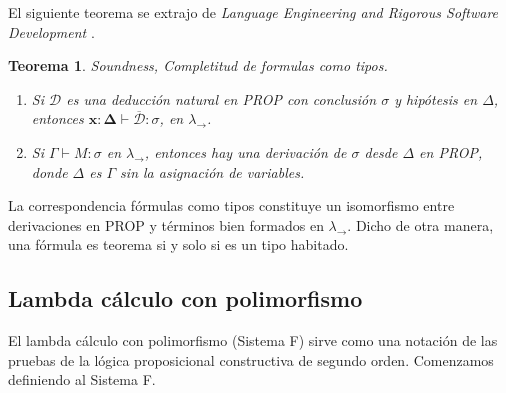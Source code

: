\documentclass[a4paper,11pt]{article}
\newtheorem{theorem}{Teorema}
\theoremstyle{definition}
\theoremstyle{remark}
\begin{document}
El siguiente teorema se extrajo de \textit{Language Engineering and Rigorous Software Development} \cite{languageEng}. 

\begin{theorem}
  Soundness, Completitud de formulas como tipos.

  \begin{enumerate}
  \item Si $\mathcal{D}$ es una deducción natural en PROP con conclusión $\sigma$ y hipótesis en $\Delta$, entonces
    $\bm{x}:\bm{\Delta} \vdash \overline{\mathcal{D}} : \sigma$, en $\lambda_{\rightarrow}$.
  \item Si $\Gamma \vdash M : \sigma$ en $\lambda_{\rightarrow}$, entonces hay una derivación de $\sigma$ desde $\Delta$ en PROP,
    donde $\Delta$ es $\Gamma$ sin la asignación de variables.
  \end{enumerate}

\end{theorem}

La correspondencia fórmulas como tipos constituye un isomorfismo entre derivaciones en PROP y términos bien formados en $\lambda_{\rightarrow}$.
Dicho de otra manera, una fórmula es teorema si y solo si es un tipo habitado.

\subsection{Lambda cálculo con polimorfismo}
\label{Lambda cálculo con polimorfismo}

El lambda cálculo con polimorfismo (Sistema F) sirve como una notación de las pruebas de la lógica proposicional constructiva
de segundo orden.
Comenzamos definiendo al Sistema F.
\end{document}
